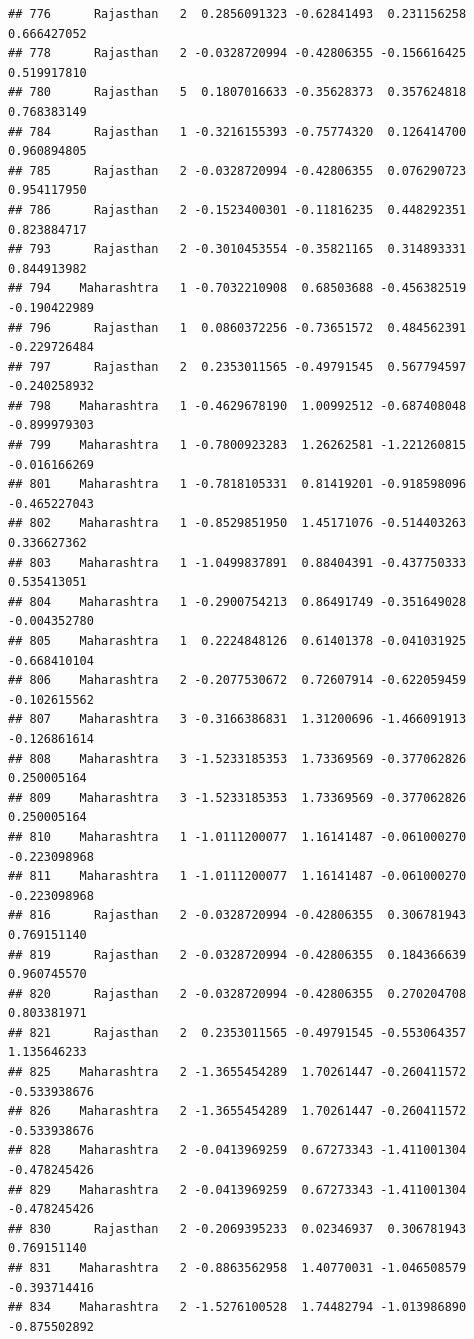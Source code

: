\documentclass[
]{article}
\begin{document}
\begin{verbatim}
## 776      Rajasthan   2  0.2856091323 -0.62841493  0.231156258  0.666427052
## 778      Rajasthan   2 -0.0328720994 -0.42806355 -0.156616425  0.519917810
## 780      Rajasthan   5  0.1807016633 -0.35628373  0.357624818  0.768383149
## 784      Rajasthan   1 -0.3216155393 -0.75774320  0.126414700  0.960894805
## 785      Rajasthan   2 -0.0328720994 -0.42806355  0.076290723  0.954117950
## 786      Rajasthan   2 -0.1523400301 -0.11816235  0.448292351  0.823884717
## 793      Rajasthan   2 -0.3010453554 -0.35821165  0.314893331  0.844913982
## 794    Maharashtra   1 -0.7032210908  0.68503688 -0.456382519 -0.190422989
## 796      Rajasthan   1  0.0860372256 -0.73651572  0.484562391 -0.229726484
## 797      Rajasthan   2  0.2353011565 -0.49791545  0.567794597 -0.240258932
## 798    Maharashtra   1 -0.4629678190  1.00992512 -0.687408048 -0.899979303
## 799    Maharashtra   1 -0.7800923283  1.26262581 -1.221260815 -0.016166269
## 801    Maharashtra   1 -0.7818105331  0.81419201 -0.918598096 -0.465227043
## 802    Maharashtra   1 -0.8529851950  1.45171076 -0.514403263  0.336627362
## 803    Maharashtra   1 -1.0499837891  0.88404391 -0.437750333  0.535413051
## 804    Maharashtra   1 -0.2900754213  0.86491749 -0.351649028 -0.004352780
## 805    Maharashtra   1  0.2224848126  0.61401378 -0.041031925 -0.668410104
## 806    Maharashtra   2 -0.2077530672  0.72607914 -0.622059459 -0.102615562
## 807    Maharashtra   3 -0.3166386831  1.31200696 -1.466091913 -0.126861614
## 808    Maharashtra   3 -1.5233185353  1.73369569 -0.377062826  0.250005164
## 809    Maharashtra   3 -1.5233185353  1.73369569 -0.377062826  0.250005164
## 810    Maharashtra   1 -1.0111200077  1.16141487 -0.061000270 -0.223098968
## 811    Maharashtra   1 -1.0111200077  1.16141487 -0.061000270 -0.223098968
## 816      Rajasthan   2 -0.0328720994 -0.42806355  0.306781943  0.769151140
## 819      Rajasthan   2 -0.0328720994 -0.42806355  0.184366639  0.960745570
## 820      Rajasthan   2 -0.0328720994 -0.42806355  0.270204708  0.803381971
## 821      Rajasthan   2  0.2353011565 -0.49791545 -0.553064357  1.135646233
## 825    Maharashtra   2 -1.3655454289  1.70261447 -0.260411572 -0.533938676
## 826    Maharashtra   2 -1.3655454289  1.70261447 -0.260411572 -0.533938676
## 828    Maharashtra   2 -0.0413969259  0.67273343 -1.411001304 -0.478245426
## 829    Maharashtra   2 -0.0413969259  0.67273343 -1.411001304 -0.478245426
## 830      Rajasthan   2 -0.2069395233  0.02346937  0.306781943  0.769151140
## 831    Maharashtra   2 -0.8863562958  1.40770031 -1.046508579 -0.393714416
## 834    Maharashtra   2 -1.5276100528  1.74482794 -1.013986890 -0.875502892

\end{verbatim}
\end{document}
